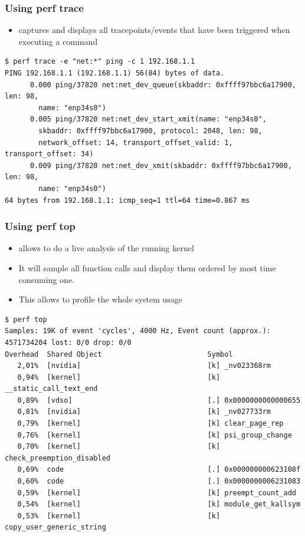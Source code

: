 \begin{frame}[fragile]
  \frametitle{Using perf trace}
  \begin{itemize}
    \item {} captures and displays all tracepoints/events that
          have been triggered when executing a command
  \end{itemize}

  \begin{block}{}
    \begin{verbatim}
$ perf trace -e "net:*" ping -c 1 192.168.1.1
PING 192.168.1.1 (192.168.1.1) 56(84) bytes of data.
      0.000 ping/37820 net:net_dev_queue(skbaddr: 0xffff97bbc6a17900, len: 98,
        name: "enp34s0")
      0.005 ping/37820 net:net_dev_start_xmit(name: "enp34s0",
        skbaddr: 0xffff97bbc6a17900, protocol: 2048, len: 98,
        network_offset: 14, transport_offset_valid: 1, transport_offset: 34)
      0.009 ping/37820 net:net_dev_xmit(skbaddr: 0xffff97bbc6a17900, len: 98,
        name: "enp34s0")
64 bytes from 192.168.1.1: icmp_seq=1 ttl=64 time=0.867 ms
    \end{verbatim}
  \end{block}
\end{frame}

\begin{frame}[fragile]
  \frametitle{Using perf top}
  \begin{itemize}
    \item {} allows to do a live analysis of the running kernel
    \item It will sample all function calls and display them ordered by most
          time consuming one.
    \item This allows to profile the whole system usage
  \end{itemize}

  \begin{block}{}
    \begin{verbatim}
$ perf top
Samples: 19K of event 'cycles', 4000 Hz, Event count (approx.): 4571734204 lost: 0/0 drop: 0/0
Overhead  Shared Object                         Symbol
   2,01%  [nvidia]                              [k] _nv023368rm
   0,94%  [kernel]                              [k] __static_call_text_end
   0,89%  [vdso]                                [.] 0x0000000000000655
   0,81%  [nvidia]                              [k] _nv027733rm
   0,79%  [kernel]                              [k] clear_page_rep
   0,76%  [kernel]                              [k] psi_group_change
   0,70%  [kernel]                              [k] check_preemption_disabled
   0,69%  code                                  [.] 0x000000000623108f
   0,60%  code                                  [.] 0x0000000006231083
   0,59%  [kernel]                              [k] preempt_count_add
   0,54%  [kernel]                              [k] module_get_kallsym
   0,53%  [kernel]                              [k] copy_user_generic_string
    \end{verbatim}
  \end{block}
\end{frame}


